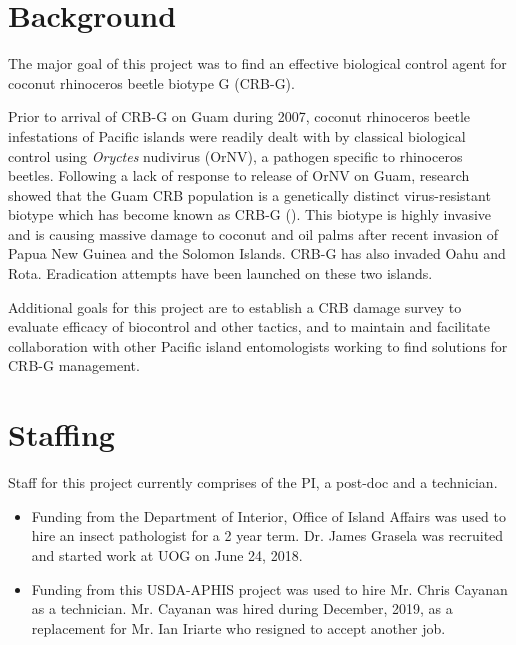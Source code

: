 \documentclass[12pt,
letterpaper,english,bibliography=totocnumbered, abstract=on]{scrartcl}
\begin{document}
\newpage
\tableofcontents{}

\newpage

\section{Background}

The major goal of this project was to find an effective biological
control agent for coconut rhinoceros beetle biotype G (CRB-G).

Prior to arrival of CRB-G on Guam during 2007, coconut rhinoceros beetle
infestations of Pacific islands were readily dealt with by classical
biological control using \textit{Oryctes} nudivirus (OrNV), a pathogen specific to rhinoceros beetles. 
Following a lack
of response to release of OrNV on Guam, research showed that the Guam
CRB population is a genetically distinct virus-resistant biotype which
has become known as CRB-G (\cite{marshall_new_2017-1}). This biotype is highly invasive and is
causing massive damage to coconut and oil palms after recent invasion of Papua New Guinea
and the Solomon Islands. CRB-G has also invaded Oahu and Rota. Eradication
attempts have been launched on these two islands.

Additional goals for this project are to establish a CRB damage survey to evaluate efficacy of biocontrol and other tactics, and to maintain and facilitate collaboration with other Pacific island entomologists working to find solutions for CRB-G management.

\section{Staffing}

Staff for this project currently comprises of the PI, a post-doc and
a technician. 

\begin{itemize}
	
\item Funding from the Department of Interior, Office of Island Affairs
was used to hire an insect pathologist for a 2 year term. Dr. James
Grasela was recruited and started work at UOG on June 24, 2018.

\item Funding from this USDA-APHIS project was used to hire Mr. Chris Cayanan as a technician. Mr. Cayanan was hired during December, 2019, as a replacement for Mr. Ian Iriarte who resigned to accept another job.

\end{itemize}
\end{document}
